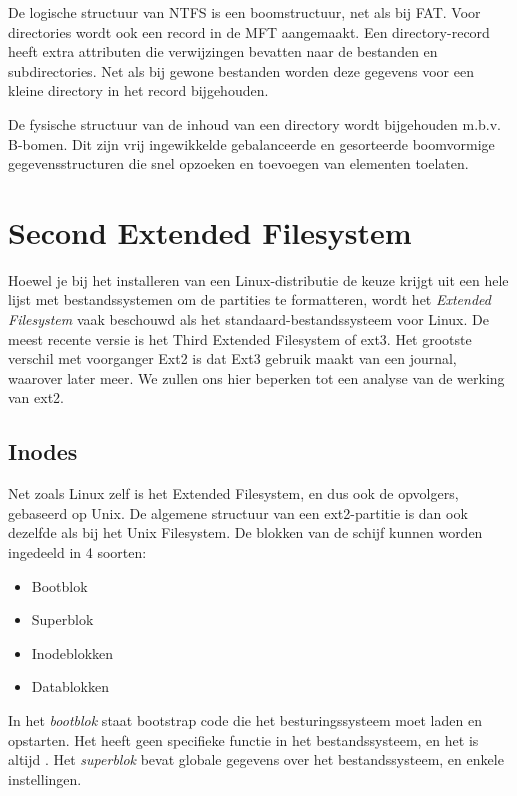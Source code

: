 De logische structuur van NTFS is een boomstructuur, net als bij
FAT. Voor directories wordt ook een record in de MFT aangemaakt. Een
directory-record heeft extra attributen die verwijzingen bevatten naar
de bestanden en subdirectories. Net als bij gewone bestanden worden
deze gegevens voor een kleine directory in het record
bijgehouden.

De fysische structuur van de inhoud van een directory wordt
bijgehouden m.b.v. B-bomen. Dit zijn vrij ingewikkelde gebalanceerde
en gesorteerde boomvormige gegevensstructuren die snel opzoeken en
toevoegen van elementen toelaten.

\section{Second Extended Filesystem}

Hoewel je bij het installeren van een Linux-distributie de keuze krijgt
uit een hele lijst met bestandssystemen om de partities te formatteren,
wordt het \emph{Extended Filesystem} vaak beschouwd als het standaard-bestandssysteem
voor Linux. De meest recente versie is het Third Extended Filesystem of ext3. Het
grootste verschil met voorganger Ext2 is dat Ext3 gebruik maakt van een journal,
waarover later meer. We zullen ons hier beperken tot een analyse van de werking van ext2.

\subsection{Inodes}

Net zoals Linux zelf is het Extended Filesystem, en dus ook de opvolgers, gebaseerd op
Unix. De algemene structuur van een ext2-partitie is dan ook dezelfde als bij het
Unix Filesystem. De blokken van de schijf kunnen worden ingedeeld in 4 soorten:

\begin{itemize}
\item Bootblok
\item Superblok
\item Inodeblokken
\item Datablokken
\end{itemize}

In het \emph{bootblok} staat bootstrap code die het besturingssysteem moet laden en opstarten.
Het heeft geen specifieke functie in het bestandssysteem, en het is altijd . Het \emph{superblok} bevat globale
gegevens over het bestandssysteem, en enkele instellingen.

